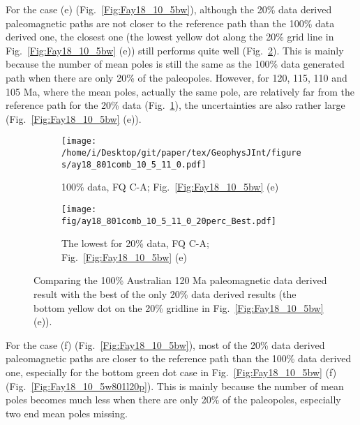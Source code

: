 For the case (e) (Fig.~\ref{Fig:Fay18_10_5bw}), although the 20\% data derived
paleomagnetic paths are not closer to the reference path than the 100\% data
derived one, the closest one (the lowest yellow dot along the 20\% grid line in
Fig.~\ref{Fig:Fay18_10_5bw} (e)) still performs quite well
(Fig.~\ref{Fig:Fay18_10_5b801l20p}). This is mainly because the number of mean
poles is still the same as the 100\% data generated path when there are only
20\% of the paleopoles. However, for 120, 115, 110 and 105 Ma, where the mean
poles, actually the same pole, are relatively far from the reference path for
the 20\% data (Fig.~\ref{Fig:Fay18_10_5b801}), the uncertainties are also
rather large (Fig.~\ref{Fig:Fay18_10_5bw} (e)).

\begin{figure*}[tbp]
  \captionsetup[subfigure]{labelformat=empty,aboveskip=-6pt,belowskip=-6pt}
  \centering
  \begin{subfigure}[htbp]{.49\textwidth}
    \captionsetup{skip=0pt}
    \centering
    \texttt{[image: /home/i/Desktop/git/paper/tex/GeophysJInt/figures/ay18\_801comb\_10\_5\_11\_0.pdf]}
	\caption{100\% data, FQ C-A; Fig.~\ref{Fig:Fay18_10_5bw}
	(e)}\label{Fig:Fay18_10_5b801}
  \end{subfigure}
  \begin{subfigure}[htbp]{.49\textwidth}
    \captionsetup{skip=0pt}
    \centering
    \texttt{[image: fig/ay18\_801comb\_10\_5\_11\_0\_20perc\_Best.pdf]} %
    \caption{The lowest for 20\% data, FQ C-A;
	Fig.~\ref{Fig:Fay18_10_5bw} (e)}\label{Fig:Fay18_10_5b801l20p}
  \end{subfigure}
  \caption[Less data, better similarity?]{Comparing the 100\% Australian
  120 Ma paleomagnetic data derived result with the best of the only
  20\% data derived results (the bottom yellow dot on the 20\% gridline in
  Fig.~\ref{Fig:Fay18_10_5bw}
  (e)).}\label{Fig:Fay18_10_5b801l20p_vs_100p}
\end{figure*}

For the case (f) (Fig.~\ref{Fig:Fay18_10_5bw}), most of the 20\% data derived
paleomagnetic paths are closer to the reference path than the 100\% data derived
one, especially for the bottom green dot case in Fig.~\ref{Fig:Fay18_10_5bw} (f)
(Fig.~\ref{Fig:Fay18_10_5w801l20p}). This is mainly because the number of mean
poles becomes much less when there are only 20\% of the paleopoles, especially
two end mean poles missing.

